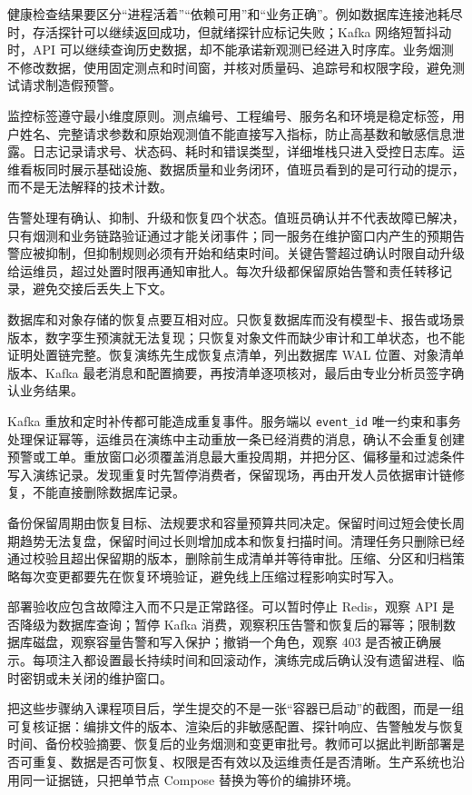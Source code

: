 健康检查结果要区分“进程活着”“依赖可用”和“业务正确”。例如数据库连接池耗尽时，存活探针可以继续返回成功，但就绪探针应标记失败；Kafka 网络短暂抖动时，API 可以继续查询历史数据，却不能承诺新观测已经进入时序库。业务烟测不修改数据，使用固定测点和时间窗，并核对质量码、追踪号和权限字段，避免测试请求制造假预警。

监控标签遵守最小维度原则。测点编号、工程编号、服务名和环境是稳定标签，用户姓名、完整请求参数和原始观测值不能直接写入指标，防止高基数和敏感信息泄露。日志记录请求号、状态码、耗时和错误类型，详细堆栈只进入受控日志库。运维看板同时展示基础设施、数据质量和业务闭环，值班员看到的是可行动的提示，而不是无法解释的技术计数。

告警处理有确认、抑制、升级和恢复四个状态。值班员确认并不代表故障已解决，只有烟测和业务链路验证通过才能关闭事件；同一服务在维护窗口内产生的预期告警应被抑制，但抑制规则必须有开始和结束时间。关键告警超过确认时限自动升级给运维员，超过处置时限再通知审批人。每次升级都保留原始告警和责任转移记录，避免交接后丢失上下文。

数据库和对象存储的恢复点要互相对应。只恢复数据库而没有模型卡、报告或场景版本，数字孪生预演就无法复现；只恢复对象文件而缺少审计和工单状态，也不能证明处置链完整。恢复演练先生成恢复点清单，列出数据库 WAL 位置、对象清单版本、Kafka 最老消息和配置摘要，再按清单逐项核对，最后由专业分析员签字确认业务结果。

Kafka 重放和定时补传都可能造成重复事件。服务端以 \texttt{event\_id} 唯一约束和事务处理保证幂等，运维员在演练中主动重放一条已经消费的消息，确认不会重复创建预警或工单。重放窗口必须覆盖消息最大重投周期，并把分区、偏移量和过滤条件写入演练记录。发现重复时先暂停消费者，保留现场，再由开发人员依据审计链修复，不能直接删除数据库记录。

备份保留周期由恢复目标、法规要求和容量预算共同决定。保留时间过短会使长周期趋势无法复盘，保留时间过长则增加成本和恢复扫描时间。清理任务只删除已经通过校验且超出保留期的版本，删除前生成清单并等待审批。压缩、分区和归档策略每次变更都要先在恢复环境验证，避免线上压缩过程影响实时写入。

部署验收应包含故障注入而不只是正常路径。可以暂时停止 Redis，观察 API 是否降级为数据库查询；暂停 Kafka 消费，观察积压告警和恢复后的幂等；限制数据库磁盘，观察容量告警和写入保护；撤销一个角色，观察 403 是否被正确展示。每项注入都设置最长持续时间和回滚动作，演练完成后确认没有遗留进程、临时密钥或未关闭的维护窗口。

把这些步骤纳入课程项目后，学生提交的不是一张“容器已启动”的截图，而是一组可复核证据：编排文件的版本、渲染后的非敏感配置、探针响应、告警触发与恢复时间、备份校验摘要、恢复后的业务烟测和变更审批号。教师可以据此判断部署是否可重复、数据是否可恢复、权限是否有效以及运维责任是否清晰。生产系统也沿用同一证据链，只把单节点 Compose 替换为等价的编排环境。

